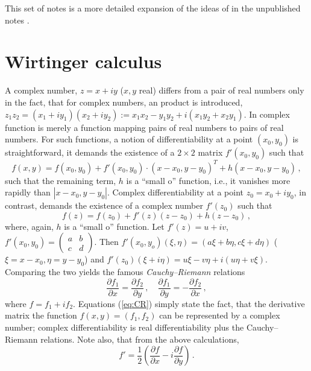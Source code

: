 \documentclass[a4paper,11pt]{article}
\begin{document}
This set of notes is a more detailed expansion of the ideas of in the unpublished notes \cite{Foster}.

\section{Wirtinger calculus}\label{sec:wirt}
A complex number, $z=x+i y$ ($x,y$ real) differs from a pair of real numbers only in the fact, that for complex numbers, an product is introduced, $z_1 z_2 = (x_1+iy_1)(x_2+iy_2):=x_1 x_2 - y_1 y_2 +i(x_1 y_2+x_2 y_1)$.
In complex function is merely a function mapping pairs of real numbers to pairs of real numbers. For such functions, a notion of differentiability at a point $(x_0,y_0)$ is straightforward, it demands the existence of a
$2\times 2$ matrix $f'(x_0,y_0)$ such that
\begin{equation}
  \label{eq:realdiff}
  f(x,y) = f(x_0,y_0) + f'(x_0,y_0)\cdot (x-x_0,y-y_0)^T + h(x-x_0,y-y_0)\,,
\end{equation}
such that the remaining term, $h$ is a ``small o'' function, i.e., it vanishes more rapidly than $|x-x_0,y-y_0|$. Complex differentiability at a point $z_0 = x_0 + iy_0$, in contrast, demands the existence of a complex
number $f'(z_0)$ such that
\begin{equation}
  \label{eq:compdiff}
  f(z) = f(z_0) + f'(z)(z-z_0) + h(z-z_0)\,,
\end{equation}
where, again, $h$ is a ``small o'' function. Let $f'(z) = u+iv$, $f'(x_0,y_0) = \begin{pmatrix}a &b \\ c & d\end{pmatrix}$. Then
$f'(x_0,y_o)(\xi,\eta) = (a\xi+b\eta,c\xi+d\eta)$ ($\xi=x-x_0, \eta=y-y_0$) and $f'(z_0)(\xi+i\eta) = u\xi-v\eta+i(u\eta+v\xi)$. Comparing the two
yields the famous {\sl Cauchy--Riemann} relations
\begin{equation}
  \label{eq:CR}
  \frac{\partial f_1}{\partial x} = \frac{\partial f_2}{\partial y}\,,\quad \frac{\partial f_1}{\partial y} = -\frac{\partial f_2}{\partial x}\,,
\end{equation}
where $f=f_1+if_2$. Equations (\ref{eq:CR}) simply state the fact, that the derivative matrix the function $f(x,y)=(f_1,f_2)$ can be represented by a complex number; complex differentiability
is real differentiability plus the Cauchy--Riemann relations.  Note also, that from the above calculations,
\begin{equation}
  \label{eq:compder}
  f' = \frac{1}{2}\left( \frac{\partial f}{\partial x} - i\frac{\partial f}{\partial y}\right)\,.
\end{equation}
\end{document}
